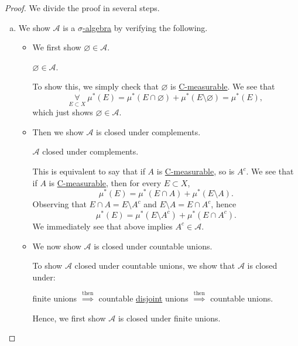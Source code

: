 \begin{proof}\let\qed\relax
	We divide the proof in several steps.
	\begin{enumerate}[(a)]
		\item We show \(\mathcal{A}\) is a \hyperref[def:sigma-algebra]{\(\sigma\)-algebra} by verifying the following.
		      \begin{itemize}
			      \item We first show \(\varnothing \in \mathcal{A} \).
			            \begin{claim}
				            \(\varnothing \in \mathcal{A} \).
			            \end{claim}
			            \begin{explanation}
				            To show this, we simply check that \(\varnothing \) is \hyperref[def:C-measurable]{C-measurable}. We see that
				            \[
					            \underset{E\subset X}{\forall}\ \mu^{\ast} (E) = \mu^{\ast} (E\cap \varnothing ) + \mu^{\ast} (E \setminus \varnothing ) = \mu^{\ast} (E),
				            \]
				            which just shows \(\varnothing \in \mathcal{A}\).
			            \end{explanation}
			      \item Then we show \(\mathcal{A} \) is closed under complements.
			            \begin{claim}
				            \(\mathcal{A} \) closed under complements.
			            \end{claim}
			            \begin{explanation}
				            This is equivalent to say that if \(A\) is \hyperref[def:C-measurable]{C-measurable}, so is \(A^{c}\). We see that if \(A\) is \hyperref[def:C-measurable]{C-measurable}, then for every \(E\subset X\),
				            \[
					            \mu^{\ast} (E) = \mu^{\ast} (E\cap A) + \mu^{\ast} (E\setminus A).
				            \]
				            Observing that \(E\cap A = E\setminus A^{c} \) and \(E\setminus A = E\cap A^{c} \), hence
				            \[
					            \mu^{\ast} (E) = \mu^{\ast} (E\setminus A^{c} ) + \mu^{\ast} (E\cap A^{c} ).
				            \]
				            We immediately see that above implies \(A^{c} \in\mathcal{A} \).
			            \end{explanation}
			      \item We now show \(\mathcal{A} \) is closed under countable unions.
			            \begin{note}
				            To show \(\mathcal{A} \) closed under countable unions, we show that \(\mathcal{A}\) is closed under:
				            \begin{center}
					            finite unions \(\overset{\text{then}}{\implies}\) countable \underline{disjoint} unions \(\overset{\text{then}}{\implies}\) countable unions.
				            \end{center}
			            \end{note}
			            Hence, we first show \(\mathcal{A} \) is closed under finite unions.


\end{itemize}
\end{enumerate}
\end{proof}
